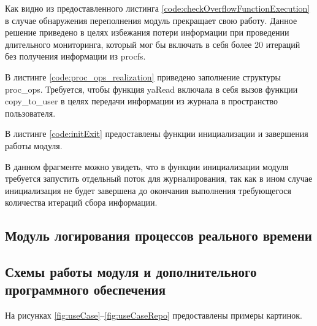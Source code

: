 Как видно из предоставленного листинга \ref{code:checkOverflowFunctionExecution} в случае обнаружения переполнения модуль прекращает свою работу. Данное решение приведено в целях избежания потери информации при проведении длительного мониторинга, который мог бы включать в себя более 20 итераций без получения информации из procfs.

В листинге \ref{code:proc_ops_realization} приведено заполнение структуры proc\_ops. Требуется, чтобы функция yaRead включала в себя вызов функции copy\_to\_user в целях передачи информации из журнала в пространство пользователя.


В листинге \ref{code:initExit} предоставлены функции инициализации и завершения работы модуля.


В данном фрагменте можно увидеть, что в функции инициализации модуля требуется запустить отдельный поток для журналирования, так как в ином случае инициализация не будет завершена до окончания выполнения требующегося количества итераций сбора информации.

\subsection{Модуль логирования процессов реального времени}

\subsection{Схемы работы модуля и дополнительного программного обеспечения}
На рисунках \ref{fig:useCase}--\ref{fig:useCaseRepo} предоставлены примеры картинок.

